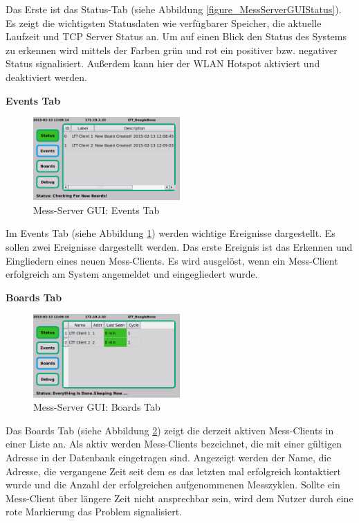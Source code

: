 Das Erste ist das Status-Tab (siehe Abbildung \ref{figure_MessServerGUIStatus}). Es zeigt die wichtigsten Statusdaten wie verfügbarer Speicher, die aktuelle Laufzeit und TCP Server Status an. Um auf einen Blick den Status des Systems zu erkennen wird mittels der Farben grün und rot ein positiver bzw. negativer Status signalisiert. Außerdem kann hier der WLAN Hotspot aktiviert und deaktiviert werden.

\textbf{Events Tab}

\begin{figure}[H]
\begin{center}
\includegraphics[width=0.5\textwidth ]{img/GUI/Server_GUI_Events1.png}
\caption{Mess-Server GUI: Events Tab}
\label{figure_MessServerGUIEvents}
\end{center}
\end{figure}

Im Events Tab (siehe Abbildung \ref{figure_MessServerGUIEvents}) werden wichtige Ereignisse dargestellt. Es sollen zwei Ereignisse dargestellt werden. Das erste Ereignis ist das Erkennen und Eingliedern eines neuen Mess-Clients. Es wird ausgelöst, wenn ein Mess-Client erfolgreich am System angemeldet und eingegliedert wurde. 

\textbf{Boards Tab}

\begin{figure}[H]
\begin{center}
\includegraphics[width=0.5\textwidth ]{img/GUI/Server_GUI_Boards1.png}
\caption{Mess-Server GUI: Boards Tab}
\label{figure_MessServerGUIBoards}
\end{center}
\end{figure}

Das Boards Tab (siehe Abbildung \ref{figure_MessServerGUIBoards}) zeigt die derzeit aktiven Mess-Clients in einer Liste an. Als aktiv werden Mess-Clients bezeichnet, die mit einer gültigen Adresse in der Datenbank eingetragen sind. Angezeigt werden der Name, die Adresse, die vergangene Zeit seit dem es das letzten mal erfolgreich kontaktiert wurde und die Anzahl der erfolgreichen aufgenommenen Messzyklen. Sollte ein Mess-Client über längere Zeit nicht ansprechbar sein, wird dem Nutzer durch eine rote Markierung das Problem signalisiert.

